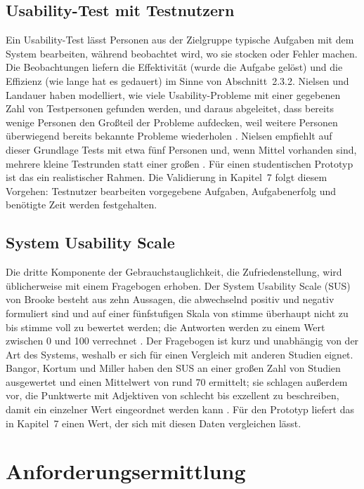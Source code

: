 \documentclass[12pt,a4paper]{scrreprt}
\begin{document}
\subsection{Usability-Test mit Testnutzern}
Ein Usability-Test lässt Personen aus der Zielgruppe typische Aufgaben mit dem System bearbeiten, während beobachtet wird, wo sie stocken oder Fehler machen. Die Beobachtungen liefern die Effektivität (wurde die Aufgabe gelöst) und die Effizienz (wie lange hat es gedauert) im Sinne von Abschnitt~2.3.2. Nielsen und Landauer haben modelliert, wie viele Usability-Probleme mit einer gegebenen Zahl von Testpersonen gefunden werden, und daraus abgeleitet, dass bereits wenige Personen den Großteil der Probleme aufdecken, weil weitere Personen überwiegend bereits bekannte Probleme wiederholen \cite{nielsenlandauer1993}. Nielsen empfiehlt auf dieser Grundlage Tests mit etwa fünf Personen und, wenn Mittel vorhanden sind, mehrere kleine Testrunden statt einer großen \cite{nielsen2000}. Für einen studentischen Prototyp ist das ein realistischer Rahmen. Die Validierung in Kapitel~7 folgt diesem Vorgehen: Testnutzer bearbeiten vorgegebene Aufgaben, Aufgabenerfolg und benötigte Zeit werden festgehalten.

\subsection{System Usability Scale}
Die dritte Komponente der Gebrauchstauglichkeit, die Zufriedenstellung, wird üblicherweise mit einem Fragebogen erhoben. Der System Usability Scale (SUS) von Brooke besteht aus zehn Aussagen, die abwechselnd positiv und negativ formuliert sind und auf einer fünfstufigen Skala von \glqq stimme überhaupt nicht zu\grqq{} bis \glqq stimme voll zu\grqq{} bewertet werden; die Antworten werden zu einem Wert zwischen 0 und 100 verrechnet \cite{brooke1996}. Der Fragebogen ist kurz und unabhängig von der Art des Systems, weshalb er sich für einen Vergleich mit anderen Studien eignet. Bangor, Kortum und Miller haben den SUS an einer großen Zahl von Studien ausgewertet und einen Mittelwert von rund 70 ermittelt; sie schlagen außerdem vor, die Punktwerte mit Adjektiven von \glqq schlecht\grqq{} bis \glqq exzellent\grqq{} zu beschreiben, damit ein einzelner Wert eingeordnet werden kann \cite{bangor2008}. Für den Prototyp liefert das in Kapitel~7 einen Wert, der sich mit diesen Daten vergleichen lässt.

\section{Anforderungsermittlung}
\end{document}

